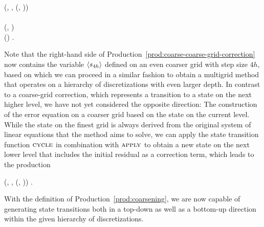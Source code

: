 \begin{production}
	 {
		(\bnfts{$\omega$}, \bnfsp {}, \bnfsp {}(, \bnfsp {})) \bnfor
	} \\
	\label{prod:coarse-coarse-grid-correction} \\
	 {
		(, \bnfsp {})
	} \\
	 {
		() \bnfsp {} \bnfsp {}.
	}
\end{production}
Note that the right-hand side of Production~\eqref{prod:coarse-coarse-grid-correction} now contains the variable $\langle s_{4h} \rangle$ defined on an even coarser grid with step size $4h$, based on which we can proceed in a similar fashion to obtain a multigrid method that operates on a hierarchy of discretizations with even larger depth.
In contrast to a coarse-grid correction, which represents a transition to a state on the next higher level, we have not yet considered the opposite direction: The construction of the error equation on a coarser grid based on the state on the current level.
While the state on the finest grid is always derived from the original system of linear equations that the method aims to solve, we can apply the state transition function $\textsc{cycle}$ in combination with $\textsc{apply}$ to obtain a new state on the next lower level that includes the initial residual as a correction term, which leads to the production
\begin{production}
 {
	(, \bnfsp {}, \bnfsp {}(, \bnfsp {}))
}.
\label{prod:coarsening}
\end{production}
With the definition of Production~\eqref{prod:coarsening}, we are now capable of generating state transitions both in a top-down as well as a bottom-up direction within the given hierarchy of discretizations.
